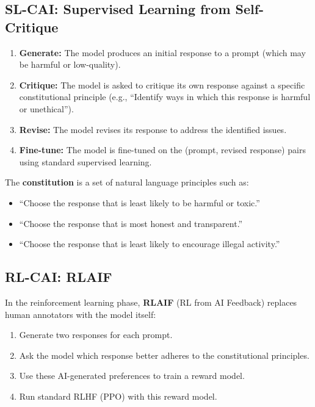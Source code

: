 \subsection{SL-CAI: Supervised Learning from Self-Critique}

\begin{enumerate}[leftmargin=*]
\item \textbf{Generate:} The model produces an initial response to a prompt
  (which may be harmful or low-quality).
\item \textbf{Critique:} The model is asked to critique its own response
  against a specific constitutional principle (e.g., ``Identify ways in
  which this response is harmful or unethical'').
\item \textbf{Revise:} The model revises its response to address the
  identified issues.
\item \textbf{Fine-tune:} The model is fine-tuned on the (prompt, revised
  response) pairs using standard supervised learning.
\end{enumerate}

The \textbf{constitution} is a set of natural language principles such as:
\begin{itemize}[leftmargin=*]
\item ``Choose the response that is least likely to be harmful or toxic.''
\item ``Choose the response that is most honest and transparent.''
\item ``Choose the response that is least likely to encourage illegal activity.''
\end{itemize}

\subsection{RL-CAI: RLAIF}

In the reinforcement learning phase, \textbf{RLAIF} (RL from AI Feedback)
replaces human annotators with the model itself:

\begin{enumerate}[leftmargin=*]
\item Generate two responses for each prompt.
\item Ask the model which response better adheres to the constitutional
  principles.
\item Use these AI-generated preferences to train a reward model.
\item Run standard RLHF (PPO) with this reward model.
\end{enumerate}


